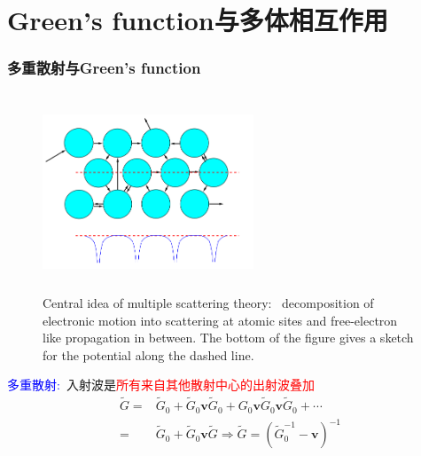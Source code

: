 {\section{\rm{Green's function}与多体相互作用}
\frame
{
	\frametitle{多重散射与\textrm{Green's function}}
\begin{figure}[h!]
	\vspace{-0.55in}
\centering
\includegraphics[height=2.32in,width=2.48in,viewport=5 0 515 475,clip]{Figures/multiple-scattering_theory.png}
\caption{\tiny \textrm{Central idea of multiple scattering theory:~ decomposition of electronic motion into scattering at atomic sites and free-electron like propagation in between. The bottom of the figure gives a sketch for the potential along the dashed line.}}
\label{Multi-scattering}
\end{figure}
\textcolor{blue}{多重散射:~}入射波是\textcolor{red}{所有来自其他散射中心的出射波叠加}
			\begin{displaymath}
				\begin{aligned}
					\tilde G=&\tilde G_0+\tilde G_0\mathbf{v}\tilde G_0+G_0\mathbf{v}\tilde G_0\mathbf{v}\tilde G_0+\cdots\\
					=&\tilde G_0+\tilde G_0\mathbf{v}\tilde G \Longrightarrow \tilde G=(\tilde G_0^{-1}-\mathbf{v})^{-1}
				\end{aligned}
			\end{displaymath}
}

}
